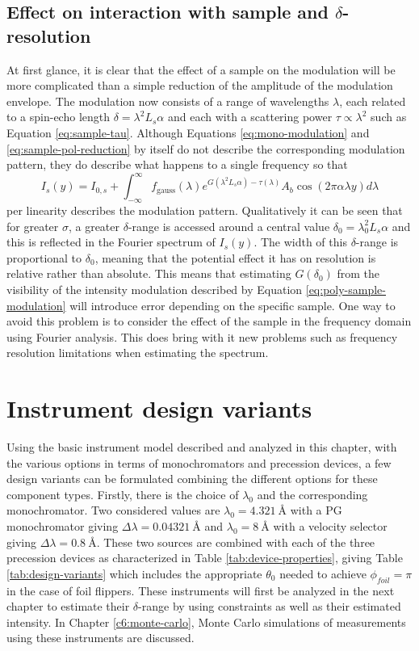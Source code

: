 \subsection{Effect on interaction with sample and $\delta$-resolution}
At first glance, it is clear that the effect of a sample on the modulation will be more complicated than a simple reduction of the amplitude of the modulation envelope. The modulation now consists of a range of wavelengths $\lambda$, each related to a spin-echo length $\delta = \lambda^2 L_s\alpha$ and each with a scattering power $\tau \propto\lambda^2$ such as Equation \eqref{eq:sample-tau}. Although Equations \eqref{eq:mono-modulation} and \eqref{eq:sample-pol-reduction} by itself do not describe the corresponding modulation pattern, they do describe what happens to a single frequency so that
\begin{equation}
	I_s(y) = I_{0,s} + \int_{-\infty}^\infty f_{\text{gauss}}(\lambda)e^{G(\lambda^2 L_s\alpha) - \tau(\lambda)}A_b\cos(2\pi\alpha\lambda y)d\lambda \label{eq:poly-sample-modulation}
\end{equation}
per linearity describes the modulation pattern. Qualitatively it can be seen that for greater $\sigma$, a greater $\delta$-range is accessed around a central value $\delta_0 = \lambda_0^2L_s\alpha$ and this is reflected in the Fourier spectrum of $I_s(y)$. The width of this $\delta$-range is proportional to $\delta_0$, meaning that the potential effect it has on resolution is relative rather than absolute. This means that estimating $G(\delta_0)$ from the visibility of the intensity modulation described by Equation \ref{eq:poly-sample-modulation} will introduce error depending on the specific sample. One way to avoid this problem is to consider the effect of the sample in the frequency domain using Fourier analysis. This does bring with it new problems such as frequency resolution limitations when estimating the spectrum.


\section{Instrument design variants}
\label{c3.7}
Using the basic instrument model described and analyzed in this chapter, with the various options in terms of monochromators and precession devices, a few design variants can be formulated combining the different options for these component types. Firstly, there is the choice of $\lambda_0$ and the corresponding monochromator. Two considered values are $\lambda_0 = \SI{4.321}{\angstrom}$ with a PG monochromator giving $\Delta\lambda = \SI{0.04321}{\angstrom}$ and $\lambda_0 = \SI{8}{\angstrom}$ with a velocity selector giving $\Delta\lambda = \SI{0.8}{\angstrom}$. These two sources are combined with each of the three precession devices as characterized in Table \ref{tab:device-properties}, giving Table \ref{tab:design-variants} which includes the appropriate $\theta_0$ needed to achieve $\phi_{foil} = \pi$ in the case of foil flippers. These instruments will first be analyzed in the next chapter to estimate their $\delta$-range by using constraints as well as their estimated intensity. In Chapter \ref{c6:monte-carlo}, Monte Carlo simulations of measurements using these instruments are discussed.

